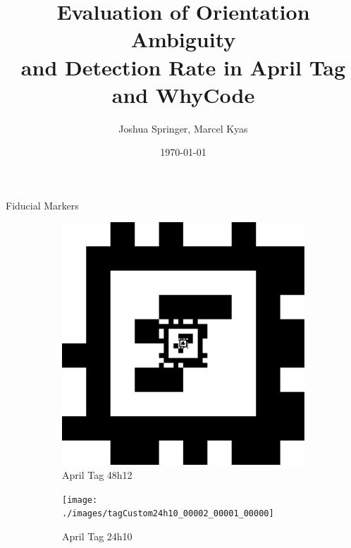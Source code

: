 \documentclass[aspectratio=169]{beamer}
\title{Evaluation of Orientation Ambiguity\\and Detection Rate in April Tag and WhyCode}
\author{Joshua Springer, Marcel Kyas}
\institute{Reykjavik University\\Department of Computer Science}
\date{\specialdate\today}
\newcommand{\nologo}{\setbeamertemplate{logo}{}}
\begin{document}
\maketitle

\nologo

\begin{frame}{Fiducial Markers}
	\vspace*{\fill}
	\begin{figure}[]
	    \centering
	    \begin{subfigure}[b]{0.23\linewidth}
		\includegraphics[width=\textwidth]{./images/tagCustom48h12_00002_00001_00000}
		    \caption{April Tag 48h12~\cite{apriltag3_paper}}
		\label{figure:apriltag48h12}
	    \end{subfigure}
		\hspace{0.01\linewidth}
	    \begin{subfigure}[b]{0.23\linewidth}
		\texttt{[image: ./images/tagCustom24h10\_00002\_00001\_00000]}
		    \caption{April Tag 24h10~\cite{fiducial_precursor_evaluation}}
		\label{figure:apriltag24h10}
	    \end{subfigure}
		\hspace{0.01\linewidth}
	    \begin{subfigure}[b]{0.23\linewidth}

\end{subfigure}
\end{figure}
\end{frame}
\end{document}
